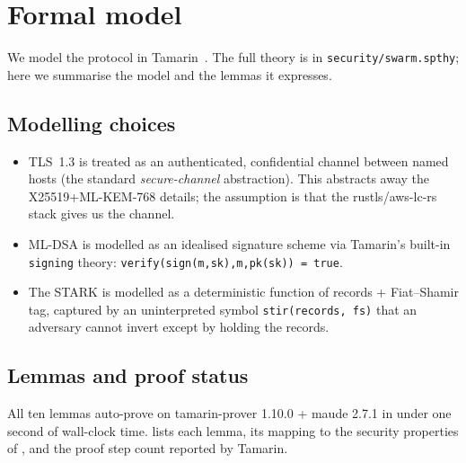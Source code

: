 \documentclass[11pt,a4paper]{article}
\theoremstyle{definition}
\theoremstyle{plain}
\begin{document}
\section{Formal model}
\label{sec:formal}

We model the protocol in Tamarin~\cite{tamarin}.  The full theory is
in \texttt{security/swarm.spthy}; here we summarise the model and the
lemmas it expresses.

\subsection{Modelling choices}

\begin{itemize}[leftmargin=*]
  \item TLS~1.3 is treated as an authenticated, confidential channel
        between named hosts (the standard \emph{secure-channel}
        abstraction).  This abstracts away the X25519+ML-KEM-768
        details; the assumption is that the rustls/aws-lc-rs stack
        gives us the channel.
  \item ML-DSA is modelled as an idealised signature scheme via
        Tamarin's built-in \texttt{signing} theory:
        \texttt{verify(sign(m,sk),m,pk(sk)) = true}.
  \item The STARK is modelled as a deterministic function of records
        + Fiat--Shamir tag, captured by an uninterpreted symbol
        \texttt{stir(records, fs)} that an adversary cannot
        invert except by holding the records.
\end{itemize}

\subsection{Lemmas and proof status}

All ten lemmas auto-prove on tamarin-prover 1.10.0 + maude 2.7.1
in under one second of wall-clock time.   lists
each lemma, its mapping to the security properties of
, and the proof step count reported by Tamarin.
\end{document}
